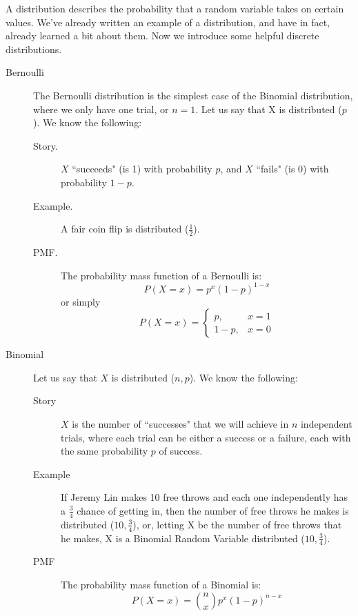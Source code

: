 \documentclass[11pt]{article}
\begin{document}
\begin{description}
A distribution describes the probability that a random variable takes on certain values. We've already written an example of a distribution, and have in fact, already learned a bit about them. Now we introduce some helpful discrete distributions.

\begin{description}
\item[Bernoulli] The Bernoulli distribution is the simplest case of the Binomial distribution, where we only have one trial, or $n=1$. Let us say that X is distributed \Bern($p$). We know the following:
\begin{description}
  \item[Story.] $X$ ``succeeds" (is 1) with probability $p$, and $X$ ``fails" (is 0) with probability $1-p$.
  \item[Example.] A fair coin flip is distributed \Bern($\frac{1}{2}$).
  \item[PMF.] The probability mass function of a Bernoulli is:
\[P(X = x) = p^x(1-p)^{1-x}\]
or simply
\[P(X = x) = \begin{cases} p, & x = 1 \\ 1-p, & x = 0 \end{cases}\]
\end{description}

\item[Binomial] Let us say that $X$ is distributed \Bin($n,p$). We know the following:
\begin{description}
  \item[Story] $X$ is the number of ``successes" that we will achieve in $n$ independent trials, where each trial can be either a success or a failure, each with the same probability $p$ of success.
  \item[Example] If Jeremy Lin makes 10 free throws and each one independently has a $\frac{3}{4}$ chance of getting in, then the number of free throws he makes is distributed  \Bin($10,\frac{3}{4}$), or, letting X be the number of free throws that he makes, X is a Binomial Random Variable distributed  \Bin($10,\frac{3}{4}$).
  \item[PMF] The probability mass function of a Binomial is:
\[P(X = x) = {n  \choose x} p^x(1-p)^{n-x}\]
\end{description}
\end{description}



\end{description}
\end{document}
